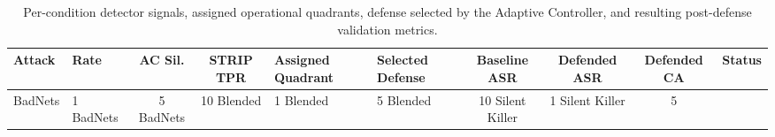 \begin{table}[t]
\centering
\small
\caption{Per-condition detector signals, assigned operational quadrants, defense selected by the Adaptive Controller, and resulting post-defense validation metrics.}
\label{tab:controller_decisions}
\begin{tabular}{ll | cc | l | l | cccc}
\hline
\textbf{Attack} & \textbf{Rate} & \textbf{AC Sil.} & \textbf{STRIP TPR} & \textbf{Assigned Quadrant} & \textbf{Selected Defense} & \textbf{Baseline ASR} & \textbf{Defended ASR} & \textbf{Defended CA} & \textbf{Status} \\
\hline
BadNets & 1%
BadNets & 5%
BadNets & 10%
Blended & 1%
Blended & 5%
Blended & 10%
Silent Killer & 1%
Silent Killer & 5%
\hline
\end{tabular}
\end{table}
